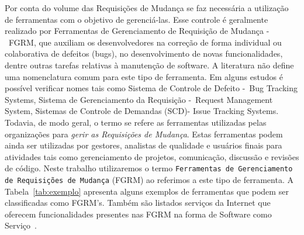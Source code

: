 Por conta do volume das Requisições de Mudança se faz necessária a utilização de
ferramentas com o objetivo de gerenciá-las. Esse controle é geralmente
realizado por Ferramentas de Gerenciamento de Requisição de Mudança -~FGRM, que auxiliam os
desenvolvedores na correção de forma individual ou colaborativa de defeitos (bugs), no
desenvolvimento de novas funcionalidades, dentre outras tarefas relativas à manutenção de software.
A literatura não define uma nomenclatura comum para este tipo de ferramenta. Em alguns estudos é
possível verificar nomes tais como Sistema de Controle de Defeito -~Bug Tracking Systems, Sistema de
Gerenciamento da Requisição -~Request Management System, Sistemas de Controle de Demandas (SCD)-
Issue Tracking Systems. Todavia, de modo geral, o termo se refere as
ferramentas utilizadas pelas organizações para \textit{gerir as Requisições de Mudança}. Estas
ferramentas podem ainda ser utilizadas por gestores, analistas de qualidade e usuários finais para
atividades tais como gerenciamento de projetos, comunicação, discussão e revisões de código. Neste
trabalho utilizaremos o termo \texttt{Ferramentas de Gerenciamento de Requisições de Mudança} (FGRM)
ao referimos a este tipo de ferramenta.  A Tabela~\ref{tab:exemplo} apresenta alguns exemplos de
ferramentas que podem ser classificadas como FGRM's. Também são listados serviços da Internet que
oferecem funcionalidades presentes nas FGRM na forma de Software como
Serviço~\cite{fox2013engineering}.

\begin{table}[ht]
	\centering
	\caption{Exemplos de ferramentas e serviços da Internet. Adaptado de~\cite{cavalcanti2014challenges}}\label{tab:exemplo}
\end{table}

